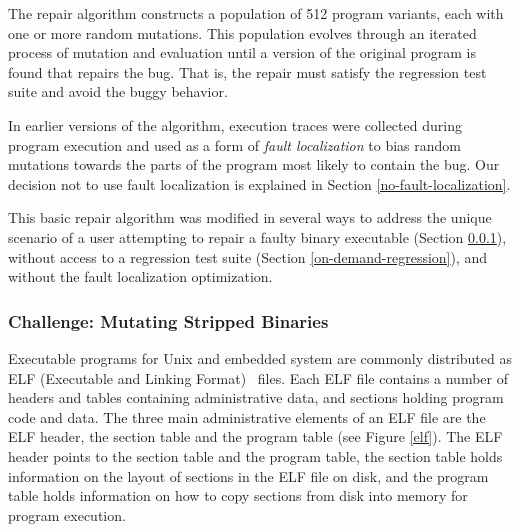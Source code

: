 \documentclass{sigcomm-alternate}
\begin{document}
The repair algorithm constructs a population of 512 program variants,
each with one or more random mutations.  This population evolves
through an iterated process of mutation and evaluation until a version
of the original program is found that repairs the bug.  That is, the
repair must satisfy the regression test suite and avoid the buggy
behavior.

In earlier versions of the algorithm, execution traces were collected
during program execution and used as a form of \emph{fault
  localization} to bias random mutations towards the parts of the
program most likely to contain the bug.  Our decision not to use fault
localization is explained in Section \ref{no-fault-localization}.

This basic repair algorithm was modified in several ways to address
the unique scenario of a user attempting to repair a faulty binary
executable (Section \ref{mutate-mips}), without access to a regression
test suite (Section \ref{on-demand-regression}), and without the fault
localization optimization.

\subsubsection{Challenge: Mutating Stripped Binaries}
\label{mutate-mips}

Executable programs for Unix and embedded system are commonly distributed
as ELF (Executable and Linking Format)~\cite{tis1995tool} files. 
Each ELF file contains a number of headers
and tables containing administrative data, and sections holding
program code and data.  The three main administrative elements of an
ELF file are the ELF header, the section table and the program table
(see Figure \ref{elf}).  The ELF header points to the section table and the
program table, the section table holds information on the layout of
sections in the ELF file on disk, and the program table holds
information on how to copy sections from disk into memory for program
execution.
\end{document}
